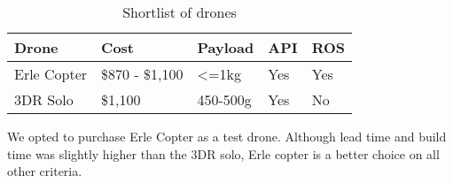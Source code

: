 \documentclass[capstone_report.tex]{subfiles}
\begin{document}
\begin{table}[H]
\centering
\begin{tabular}{@{}lllll@{}}
\toprule
Drone       & Cost          & Payload       & API & ROS \\ \midrule
Erle Copter & \$870 - \$1,100 & \textless=1kg & Yes & Yes \\
3DR Solo    & \$1,100       & 450-500g      & Yes & No  \\ \bottomrule
\end{tabular}
\caption{Shortlist of drones\label{eligible_drones}}
\end{table}

We opted to purchase Erle Copter as a test drone.  Although lead time and build time was slightly higher than the 3DR solo, Erle copter is a better choice on all other criteria.\\
\end{document}
